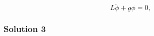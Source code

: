 \documentclass{article}
\begin{document}
\[
L\ddot{\phi} + g\phi = 0,
\]

\subsubsection{Solution 3}






\end{document}
